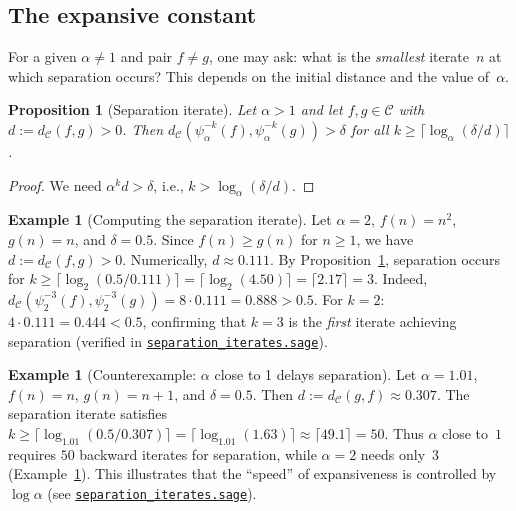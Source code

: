\documentclass[11pt,a4paper]{article}
\newcommand{\repourl}{https://github.com/gabayae/expansive-homeomorphisms-complexity-qmetric}
\theoremstyle{plain}
\newtheorem{propositioninner}[theoreminner]{Proposition}
\theoremstyle{definition}
\newtheorem{exampleinner}[theoreminner]{Example}
\newenvironment{proposition}[1][]{\begin{propositioninner}[#1]}{\end{propositioninner}}
\newenvironment{example}[1][]{\begin{exampleinner}[#1]}{\end{exampleinner}}
\newcommand{\C}{\mathcal{C}}
\begin{document}
\subsection{The expansive constant}

For a given $\alpha\neq 1$ and pair $f\neq g$, one may ask: what is
the \emph{smallest} iterate~$n$ at which separation occurs?  This
depends on the initial distance and the value of~$\alpha$.

\begin{proposition}[Separation iterate]\label{prop:sep-iterate}
Let $\alpha>1$ and let $f,g\in\C$ with $d:=d_\C(f,g)>0$.  Then
$d_\C(\psi_\alpha^{-k}(f),\psi_\alpha^{-k}(g))>\delta$ for all
$k\ge\lceil\log_\alpha(\delta/d)\rceil$.
\end{proposition}

\begin{proof}
We need $\alpha^k d>\delta$, i.e.,
$k>\log_\alpha(\delta/d)$.
\end{proof}

\begin{example}[Computing the separation iterate]\label{ex:sep-iterate-num}
Let $\alpha=2$, $f(n)=n^2$, $g(n)=n$, and $\delta=0.5$.  Since
$f(n)\ge g(n)$ for $n\ge 1$, we have $d:=d_\C(f,g)>0$.
Numerically, $d\approx 0.111$.  By Proposition~\ref{prop:sep-iterate},
separation occurs for
$k\ge\lceil\log_2(0.5/0.111)\rceil=\lceil\log_2(4.50)\rceil
=\lceil 2.17\rceil=3$.
Indeed, $d_\C(\psi_2^{-3}(f),\psi_2^{-3}(g))=8\cdot 0.111
=0.888>0.5$.  For $k=2$: $4\cdot 0.111=0.444<0.5$, confirming
that $k=3$ is the \emph{first} iterate achieving separation
(verified in
\href{\repourl/blob/main/code/sagemath/separation_iterates.sage}{\texttt{separation\_iterates.sage}}).
\end{example}

\begin{example}[Counterexample: $\alpha$ close to 1 delays separation]\label{ex:slow-sep}
Let $\alpha=1.01$, $f(n)=n$, $g(n)=n+1$, and $\delta=0.5$.
Then $d:=d_\C(g,f)\approx 0.307$.  The separation iterate satisfies
$k\ge\lceil\log_{1.01}(0.5/0.307)\rceil=\lceil\log_{1.01}(1.63)\rceil
\approx\lceil 49.1\rceil=50$.
Thus $\alpha$ close to~$1$ requires $50$ backward iterates
for separation, while $\alpha=2$ needs only~$3$ (Example~\ref{ex:sep-iterate-num}).
This illustrates that the ``speed'' of expansiveness is controlled
by $\log\alpha$
(see \href{\repourl/blob/main/code/sagemath/separation_iterates.sage}{\texttt{separation\_iterates.sage}}).
\end{example}
\end{document}
